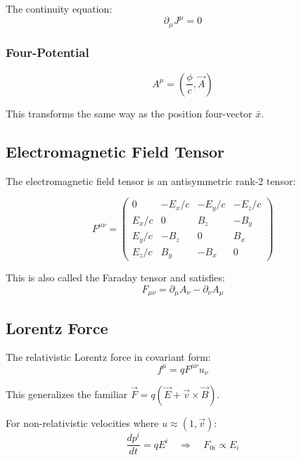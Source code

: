 \documentclass[11pt,a4paper]{article}
\begin{document}
The continuity equation:
\begin{equation}
\partial_\mu J^\mu = 0
\end{equation}

\subsubsection{Four-Potential}
\begin{equation}
A^\mu = \left(\frac{\phi}{c}, \vec{A}\right)
\end{equation}

This transforms the same way as the position four-vector $\bar{x}$.

\subsection{Electromagnetic Field Tensor}

The electromagnetic field tensor is an antisymmetric rank-2 tensor:

\begin{equation}
F^{\mu\nu} = \begin{pmatrix}
0 & -E_x/c & -E_y/c & -E_z/c \\
E_x/c & 0 & B_z & -B_y \\
E_y/c & -B_z & 0 & B_x \\
E_z/c & B_y & -B_x & 0
\end{pmatrix}
\end{equation}

This is also called the Faraday tensor and satisfies:
\begin{equation}
F_{\mu\nu} = \partial_\mu A_\nu - \partial_\nu A_\mu
\end{equation}

\subsection{Lorentz Force}

The relativistic Lorentz force in covariant form:
\begin{equation}
f^\mu = q F^{\mu\nu} u_\nu
\end{equation}

This generalizes the familiar $\vec{F} = q(\vec{E} + \vec{v} \times \vec{B})$.

For non-relativistic velocities where $u \approx (1, \vec{v})$:
\begin{equation}
\frac{dp^i}{dt} = q E^i \quad \Rightarrow \quad F_{0i} \propto E_i
\end{equation}
\end{document}
